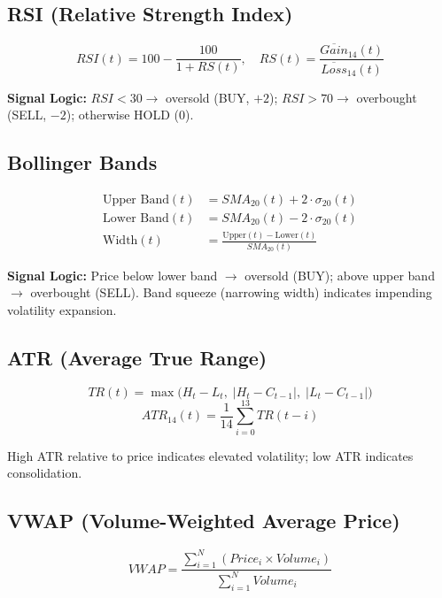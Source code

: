 \documentclass[12pt, a4paper, oneside]{report}
\begin{document}
\subsection{RSI (Relative Strength Index)}

\begin{equation}
    RSI(t) = 100 - \frac{100}{1 + RS(t)}, \quad RS(t) = \frac{\overline{Gain}_{14}(t)}{\overline{Loss}_{14}(t)}
\end{equation}

\textbf{Signal Logic:} $RSI < 30 \to$ oversold (BUY, $+2$); $RSI > 70 \to$ overbought (SELL, $-2$); otherwise HOLD (0).

\subsection{Bollinger Bands}

\begin{align}
    \text{Upper Band}(t) &= SMA_{20}(t) + 2 \cdot \sigma_{20}(t) \\
    \text{Lower Band}(t) &= SMA_{20}(t) - 2 \cdot \sigma_{20}(t) \\
    \text{Width}(t) &= \frac{\text{Upper}(t) - \text{Lower}(t)}{SMA_{20}(t)}
\end{align}

\textbf{Signal Logic:} Price below lower band $\to$ oversold (BUY); above upper band $\to$ overbought (SELL). Band squeeze (narrowing width) indicates impending volatility expansion.

\subsection{ATR (Average True Range)}

\begin{equation}
    TR(t) = \max\big(H_t - L_t,\; |H_t - C_{t-1}|,\; |L_t - C_{t-1}|\big)
\end{equation}
\begin{equation}
    ATR_{14}(t) = \frac{1}{14} \sum_{i=0}^{13} TR(t-i)
\end{equation}

High ATR relative to price indicates elevated volatility; low ATR indicates consolidation.

\subsection{VWAP (Volume-Weighted Average Price)}

\begin{equation}
    VWAP = \frac{\sum_{i=1}^{N} (Price_i \times Volume_i)}{\sum_{i=1}^{N} Volume_i}
\end{equation}
\end{document}
